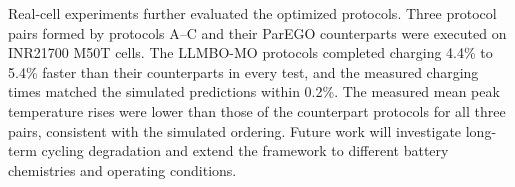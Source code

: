 \documentclass[journal,10pt]{IEEEtran}
\begin{document}
Real-cell experiments further evaluated the optimized
protocols. Three protocol pairs formed by protocols A--C
and their ParEGO counterparts were executed on INR21700
M50T cells. The LLMBO-MO protocols completed charging
4.4\% to 5.4\% faster than their counterparts in every
test, and the measured charging times matched the
simulated predictions within 0.2\%. The measured mean
peak temperature rises were lower than those of the
counterpart protocols for all three pairs, consistent
with the simulated ordering.
Future work will investigate long-term cycling degradation
and extend the framework to different battery chemistries
and operating conditions.
\end{document}
